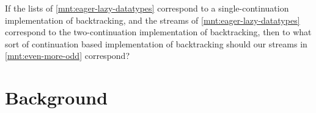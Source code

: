 \documentclass[screen,anonymous,review,draft,natbib=false]{acmart} %
\newcommand{\meta}[2]{[\textsc{#1}: \emph{#2}]}
\newcommand{\todo}[1]{\textcolor{red}{\meta{TODO}{#1}}}
\begin{document}
If the lists of \cref{mnt:eager-lazy-datatypes} correspond to a
single-continuation implementation of backtracking, and the streams of
\cref{mnt:eager-lazy-datatypes} correspond to the two-continuation
implementation of backtracking, then to what sort of continuation
based implementation of backtracking should our streams in
\cref{mnt:even-more-odd} correspond? 

\section{Background}\label{sec:background}















\end{document}
